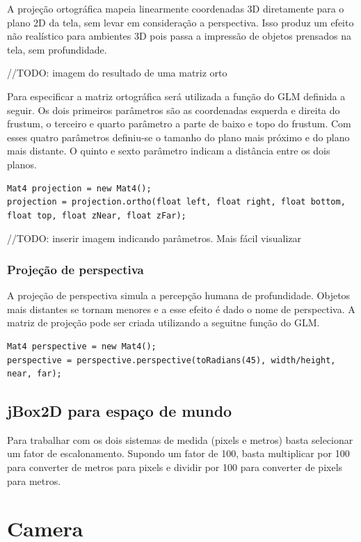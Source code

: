 \documentclass[12pt, 
openright, 
oneside, 
a4paper,    
brazil]{facom-ufu-abntex2}
\begin{document}
A projeção ortográfica mapeia linearmente coordenadas 3D diretamente para o plano 2D da tela, sem levar em consideração a perspectiva. Isso produz um efeito não realístico para ambientes 3D pois passa a impressão de objetos prensados na tela, sem profundidade.

//TODO: imagem do resultado de uma matriz orto

Para especificar a matriz ortográfica será utilizada a função do GLM definida a seguir. Os dois primeiros parâmetros são as coordenadas esquerda e direita do frustum, o terceiro e quarto parâmetro a parte de baixo e topo do frustum. Com esses quatro parâmetros definiu-se o tamanho do plano mais próximo e do plano mais distante. O quinto e sexto parâmetro indicam a distância entre os dois planos.

\begin{lstlisting}[caption=Função Ortho do GLM]
Mat4 projection = new Mat4();
projection = projection.ortho(float left, float right, float bottom, float top, float zNear, float zFar);
\end{lstlisting}
//TODO: inserir imagem indicando parâmetros. Mais fácil visualizar

\subsubsection{Projeção de perspectiva}
A projeção de perspectiva simula a percepção humana de profundidade. Objetos mais distantes se tornam menores e a esse efeito é dado o nome de perspectiva.
A matriz de projeção pode ser criada utilizando a seguitne função do GLM.
\begin{lstlisting}[caption=Função Perspective do GLM]
Mat4 perspective = new Mat4();
perspective = perspective.perspective(toRadians(45), width/height, near, far);
\end{lstlisting}

\subsection{jBox2D para espaço de mundo}

Para trabalhar com os dois sistemas de medida (pixels e metros) basta selecionar um fator de escalonamento. Supondo um fator de 100, basta multiplicar por 100 para converter de metros para pixels e dividir por 100 para converter de pixels para metros.

\section{Camera}
\end{document}
